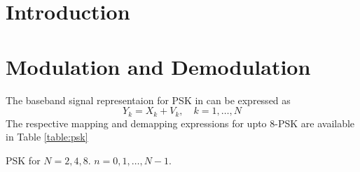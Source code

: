 \documentclass[journal,12pt,twocolumn]{IEEEtran}
\begin{document}
\section{Introduction}
%
\section{Modulation and Demodulation}
The baseband signal representaion for PSK in \cite{dvbs2} can be expressed as 
\begin{equation}
Y_k= X_k + V_k, \quad k = 1,\dots,N
\end{equation} 
The respective 
mapping and demapping expressions for upto 8-PSK are available in Table \ref{table:psk}
\begin{table}[!ht]
\begin{center}

\end{center}
\caption{PSK for $N=2,4,8$. $n = 0, 1, \dots, N-1.$}
\label{table:psk}
\end{table}
%
\end{document}
